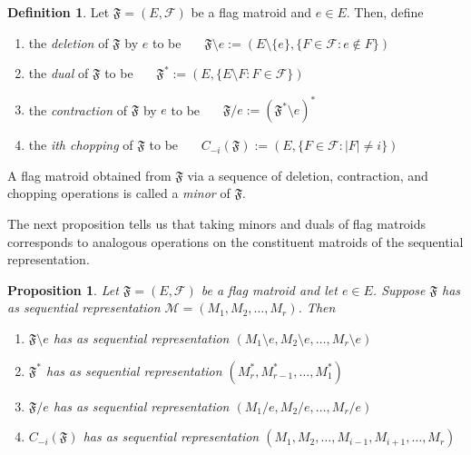 \documentclass[12pt]{article}
\newtheorem{prop}[thm]{Proposition}
\theoremstyle{definition}
\newtheorem{defn}[thm]{Definition}
\begin{document}
\begin{defn}\label{defn: flag matroid minors and duality}
    Let $\mathfrak{F} = (E,\mathcal{F})$ be a flag matroid and $e \in E$.
    Then, define
    \begin{enumerate}
        \item the \emph{deletion} of $\mathfrak{F}$ by $e$ to be \ \ \ $\mathfrak{F} \setminus e := (E\setminus \{e\},\{F \in \mathcal{F} : e \notin F\})$
        \item the \emph{dual} of $\mathfrak{F}$ to be \ \ \ $\mathfrak{F}^* := (E,\{E \setminus F : F \in \mathcal{F}\})$
        \item the \emph{contraction} of $\mathfrak{F}$ by $e$ to be \ \ \ $\mathfrak{F} / e := (\mathfrak{F}^*\setminus e)^*$
        \item the \emph{ith chopping} of $\mathfrak{F}$ to be \ \ \ $C_{-i}(\mathfrak{F}) := (E,\{F \in \mathcal{F} : |F| \neq i\})$
    \end{enumerate}
    A flag matroid obtained from $\mathfrak{F}$ via a sequence of deletion, contraction, and chopping operations is called a \emph{minor} of $\mathfrak{F}$.
\end{defn}

The next proposition tells us that taking minors and duals of flag matroids corresponds to analogous operations on the constituent matroids of the sequential representation.


\begin{prop}\label{prop: minors sequential representation}
    Let $\mathfrak{F} = (E, \mathcal{F})$ be a flag matroid and let $e \in E$. Suppose $\mathfrak{F}$ has as sequential representation $\mathcal{M} = (M_1, M_2, \dots, M_r)$. Then 
    \begin{enumerate}
        \item $\mathfrak{F}\setminus e$ has as sequential representation $(M_1\setminus e, M_2\setminus e, \dots, M_r\setminus e)$ 
        \item $\mathfrak{F}^*$ has as sequential representation $ (M_{r}^*, M_{r-1}^*, \dots, M_1^*)$ 
        \item $\mathfrak{F}/e$ has as sequential representation $(M_1 /e, M_2/e, \dots, M_r/e)$
        \item $C_{-i}(\mathfrak{F})$ has as sequential representation $(M_1, M_2, \dots, M_{i-1}, M_{i+1}, \dots, M_r)$
    \end{enumerate}
\end{prop}
\end{document}

